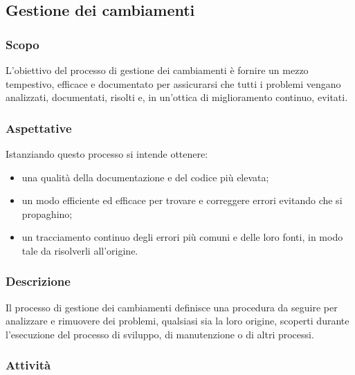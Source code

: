 \subsection{Gestione dei cambiamenti}

	\subsubsection{Scopo}
		L'obiettivo del processo di gestione dei cambiamenti è fornire un mezzo tempestivo, efficace e documentato per assicurarsi che tutti i problemi vengano analizzati, documentati, risolti e, in un'ottica di miglioramento continuo, evitati.

	\subsubsection{Aspettative}
		Istanziando questo processo si intende ottenere:
		\begin{itemize}
		 	\item una qualità della documentazione e del codice più elevata;
		 	\item un modo efficiente ed efficace per trovare e correggere errori evitando che si propaghino;
		 	\item un tracciamento continuo degli errori più comuni e delle loro fonti, in modo tale da risolverli all'origine.
		 \end{itemize}
	\subsubsection{Descrizione}
		Il processo di gestione dei cambiamenti definisce una procedura da seguire per analizzare e rimuovere dei problemi, qualsiasi sia la loro origine, scoperti durante l'esecuzione del processo di sviluppo, di manutenzione o di altri processi.

	\subsubsection{Attività}
